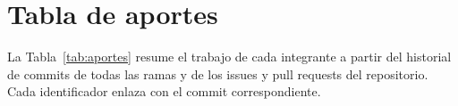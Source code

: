 \section{Tabla de aportes}
\label{sec:tabla-aportes}

\newcommand{\cm}[1]{\href{https://github.com/DarwinDevCode/AD_TA-PFC-E1/commit/#1}{\texttt{#1}}}
\newcommand{\iss}[1]{\href{https://github.com/DarwinDevCode/AD_TA-PFC-E1/issues/#1}{issue~\##1}}
\newcommand{\pr}[1]{\href{https://github.com/DarwinDevCode/AD_TA-PFC-E1/pull/#1}{PR~\##1}}

La Tabla~\ref{tab:aportes} resume el trabajo de cada integrante a partir del historial de commits de todas las ramas y de los issues y pull requests del repositorio. Cada identificador enlaza con el commit correspondiente.

